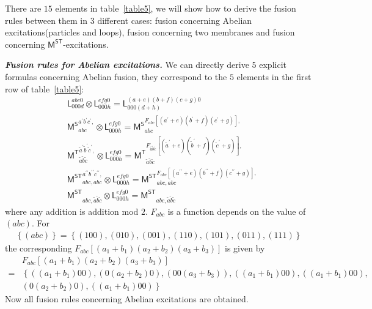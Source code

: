\documentclass[11pt,nofootinbib,preprint]{revtex4-1}
\begin{document}
There are $15$ elements in table~\ref{table5}, we will show how to derive the fusion rules between them in $3$ different cases: fusion concerning Abelian excitations(particles and loops), fusion concerning two membranes and fusion concerning $\mathsf{M^{ST}}$-excitations.

\textbf{\textit{Fusion rules for Abelian excitations.}}
We can directly derive $5$ explicit formulas concerning Abelian fusion, they correspond to the $5$ elements in the first row of table~\ref{table5}:
\begin{align}
	&\mathsf{L}_{000d}^{abc0}\otimes \mathsf{L}_{000h}^{efg0}=\mathsf{L}_{000\left( d+h \right)}^{\left( a+e \right) \left( b+f \right) \left( c+g \right) 0}
	\\
	&\mathsf{M^S}_{abc}^{a^{\prime}b^{\prime}c^{\prime},}\otimes \mathsf{L}_{000h}^{efg0}=\mathsf{M^S}_{abc}^{F_{abc}\left[ \left( a^{\prime}+e \right) \left( b^{\prime}+f \right) \left( c^{\prime}+g \right) \right] ,}
	\\
	&\mathsf{M^T}_{\tilde{a}\tilde{b}\tilde{c}}^{\tilde{a}^{\prime}\tilde{b}^{\prime}\tilde{c}^{\prime},}\otimes \mathsf{L}_{000h}^{efg0}=\mathsf{M^T}_{\tilde{a}\tilde{b}\tilde{c}}^{F_{\tilde{a}\tilde{b}\tilde{c}}\left[ \left( \tilde{a}^{\prime}+e \right) \left( \tilde{b}^{\prime}+f \right) \left( \tilde{c}^{\prime}+g \right) \right] ,}
	\\
	&\mathsf{M^{ST}}_{abc,abc}^{a^{\prime\prime}b^{\prime\prime}c^{\prime\prime},}\otimes \mathsf{L}_{000h}^{efg0}=\mathsf{M^{ST}}_{abc,abc}^{F_{abc}\left[ \left( a^{\prime\prime}+e \right) \left( b^{\prime\prime}+f \right) \left( c^{\prime\prime}+g \right) \right] ,}
	\\
	&\mathsf{M^{ST}}_{abc,\tilde{a}\tilde{b}\tilde{c}}\otimes \mathsf{L}_{000h}^{efg0}=\mathsf{M^{ST}}_{abc,\tilde{a}\tilde{b}\tilde{c}}
\end{align}
where any addition is addition mod $2$. $F_{abc}$ is a function depends on the value of $\left( abc\right)$. For
\begin{align}
	\left\{ \left( abc \right) \right\} =\left\{ \left( 100 \right), \left( 010 \right), \left( 001 \right), \left( 110 \right), \left( 101 \right), \left( 011 \right), \left( 111 \right) \right\} 
\end{align}
the corresponding $F_{abc}\left[ \left( a_1+b_1 \right) \left( a_2+b_2 \right) \left( a_3+b_3 \right) \right]$ is given by
\begin{align}
	&F_{abc}\left[ \left( a_1+b_1 \right) \left( a_2+b_2 \right) \left( a_3+b_3 \right) \right] \nonumber
	\\
	=&\left\{ \left(\left( a_1+b_1 \right)00\right),\left(0\left( a_2+b_2 \right)0\right),\left(00\left( a_3+b_3 \right)\right),\left(\left( a_1+b_1 \right)00\right),\left(\left( a_1+b_1 \right)00\right),\right.\nonumber\\
	&\left.\left(0\left( a_2+b_2 \right)0\right),\left(\left( a_1+b_1 \right)00\right) \right\}
\end{align}
Now all fusion rules concerning Abelian excitations are obtained. 
\end{document}
